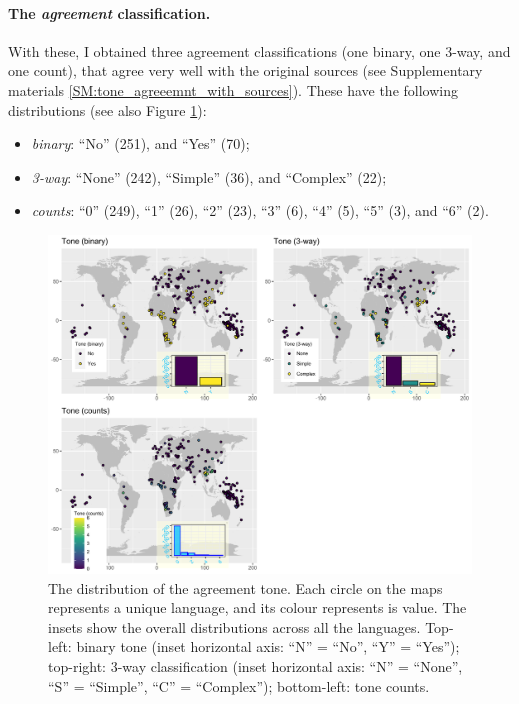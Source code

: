 \documentclass[twoside,onecolumn]{article}
\begin{document}
\paragraph{The \emph{agreement} classification.}
With these, I obtained three agreement classifications (one binary, one 3-way, and one count), that agree very well with the original sources (see Supplementary materials \ref{SM:tone_agreeemnt_with_sources}).
These have the following distributions (see also Figure \ref{Fig:map_tone}):

\begin{itemize}
  \item \emph{binary}: ``No'' (251), and ``Yes'' (70);
  \item \emph{3-way}: ``None'' (242), ``Simple'' (36), and ``Complex'' (22);
  \item \emph{counts}: ``0'' (249), ``1'' (26), ``2'' (23), ``3'' (6), ``4'' (5), ``5'' (3), and ``6'' (2).
\end{itemize}

\begin{figure}[h]
  \centering
  \includegraphics[width=\textwidth]{../../code/figures/map_tone}
  \caption{The distribution of the agreement tone. Each circle on the maps represents a unique language, and its colour represents is value. The insets show the overall distributions across all the languages. Top-left: binary tone (inset horizontal axis: ``N'' = ``No'', ``Y'' = ``Yes''); top-right: 3-way classification (inset horizontal axis: ``N'' = ``None'', ``S'' = ``Simple'', ``C'' = ``Complex''); bottom-left: tone counts.}
  \label{Fig:map_tone}
\end{figure}
\end{document}
